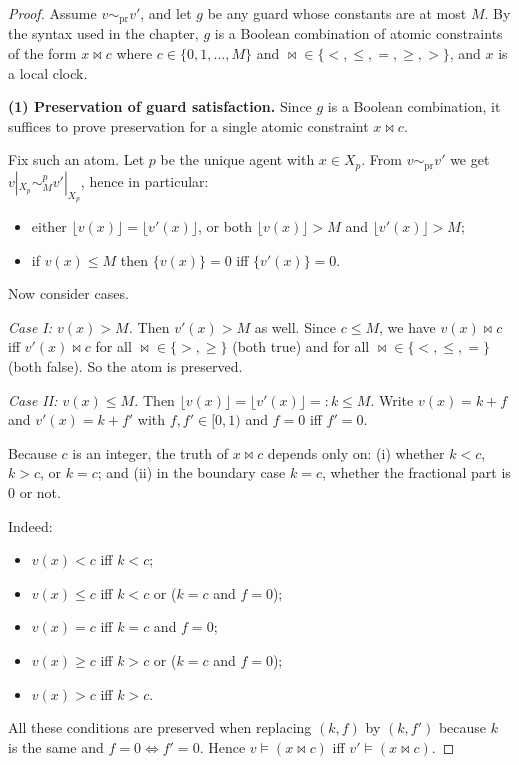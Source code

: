 \begin{proof}
Assume $v \sim_{\mathrm{pr}} v'$, and let $g$ be any guard whose constants are at
most $M$. By the syntax used in the chapter, $g$ is a Boolean combination of
atomic constraints of the form $x \bowtie c$ where $c\in\{0,1,\dots,M\}$ and
$\bowtie\in\{<,\le,=,\ge,>\}$, and $x$ is a local clock.

\medskip\noindent
\textbf{(1) Preservation of guard satisfaction.}
Since $g$ is a Boolean combination, it suffices to prove preservation for a
single atomic constraint $x\bowtie c$.

Fix such an atom. Let $p$ be the unique agent with $x\in X_p$.
From $v \sim_{\mathrm{pr}} v'$ we get $v|_{X_p} \sim^p_M v'|_{X_p}$, hence in
particular:
\begin{itemize}
  \item either $\lfloor v(x)\rfloor=\lfloor v'(x)\rfloor$, or both
        $\lfloor v(x)\rfloor > M$ and $\lfloor v'(x)\rfloor > M$;
  \item if $v(x)\le M$ then $\{v(x)\}=0$ iff $\{v'(x)\}=0$.
\end{itemize}

Now consider cases.

\smallskip\noindent
\emph{Case I: $v(x)>M$.}
Then $v'(x)>M$ as well. Since $c\le M$, we have $v(x)\bowtie c$ iff $v'(x)\bowtie c$
for all $\bowtie\in\{>,\ge\}$ (both true) and for all $\bowtie\in\{<,\le,=\}$
(both false). So the atom is preserved.

\smallskip\noindent
\emph{Case II: $v(x)\le M$.}
Then $\lfloor v(x)\rfloor=\lfloor v'(x)\rfloor=:k\le M$.
Write $v(x)=k+f$ and $v'(x)=k+f'$ with $f,f'\in[0,1)$ and $f=0$ iff $f'=0$.

Because $c$ is an integer, the truth of $x\bowtie c$ depends only on:
(i) whether $k<c$, $k>c$, or $k=c$; and (ii) in the boundary case $k=c$, whether
the fractional part is $0$ or not.

Indeed:
\begin{itemize}
  \item $v(x) < c$ iff $k<c$;
  \item $v(x) \le c$ iff $k<c$ or ($k=c$ and $f=0$);
  \item $v(x) = c$ iff $k=c$ and $f=0$;
  \item $v(x) \ge c$ iff $k>c$ or ($k=c$ and $f=0$);
  \item $v(x) > c$ iff $k>c$.
\end{itemize}
All these conditions are preserved when replacing $(k,f)$ by $(k,f')$ because
$k$ is the same and $f=0 \Leftrightarrow f'=0$.
Hence $v\models (x\bowtie c)$ iff $v'\models (x\bowtie c)$.


\end{proof}
